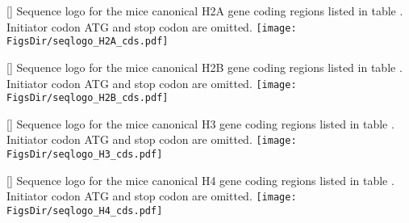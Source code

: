 
\newpage
\begin{center}
  []{
    Sequence logo for the mice canonical H2A gene coding regions
    listed in table .
    Initiator codon ATG and stop codon are omitted.
  }
  \label{fig:h2a-histone-gene-variation}
  \texttt{[image: \\FigsDir/seqlogo\_H2A\_cds.pdf]}
\end{center}
\newpage
\begin{center}
  []{
    Sequence logo for the mice canonical H2B gene coding regions
    listed in table .
    Initiator codon ATG and stop codon are omitted.
  }
  \label{fig:h2b-histone-gene-variation}
  \texttt{[image: \\FigsDir/seqlogo\_H2B\_cds.pdf]}
\end{center}
\newpage
\begin{center}
  []{
    Sequence logo for the mice canonical H3 gene coding regions
    listed in table .
    Initiator codon ATG and stop codon are omitted.
  }
  \label{fig:h3-histone-gene-variation}
  \texttt{[image: \\FigsDir/seqlogo\_H3\_cds.pdf]}
\end{center}
\newpage
\begin{center}
  []{
    Sequence logo for the mice canonical H4 gene coding regions
    listed in table .
    Initiator codon ATG and stop codon are omitted.
  }
  \label{fig:h4-histone-gene-variation}
  \texttt{[image: \\FigsDir/seqlogo\_H4\_cds.pdf]}
\end{center}

